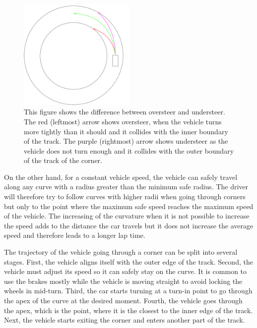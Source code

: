 \begin{figure}
	\centering
	\label{fig:oversteer_understeer}
	\includegraphics[trim=250 180 20 0, clip,width=0.5\textwidth]{../img/understeer_oversteer}
	\caption{This figure shows the difference between oversteer and understeer. The red (leftmost) arrow shows oversteer, when the vehicle turns more tightly than it should and it collides with the inner boundary of the track. The purple (rightmost) arrow shows understeer as the vehicle does not turn enough and it collides with the outer boundary of the track of the corner.}
\end{figure}

On the other hand, for a constant vehicle speed, the vehicle can safely travel along any curve with a radius greater than the minimum safe radius. The driver will therefore try to follow curves with higher radii when going through corners but only to the point where the maximum safe speed reaches the maximum speed of the vehicle. The increasing of the curvature when it is not possible to increase the speed adds to the distance the car travels but it does not increase the average speed and therefore leads to a longer lap time.

The trajectory of the vehicle going through a corner can be split into several stages. First, the vehicle aligns itself with the outer edge of the track. Second, the vehicle must adjust its speed so it can safely stay on the curve. It is common to use the brakes mostly while the vehicle is moving straight to avoid locking the wheels in mid-turn. Third, the car starts turning at a turn-in point to go through the apex of the curve at the desired moment. Fourth, the vehicle goes through the apex, which is the point, where it is the closest to the inner edge of the track. Next, the vehicle starts exiting the corner and enters another part of the track.

